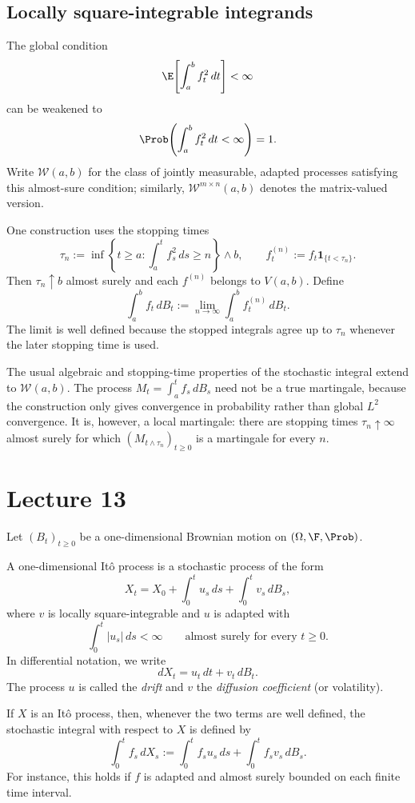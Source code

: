 \subsection*{Locally square-integrable integrands}
The global condition
\[
 \E\!\left[\int_a^b f_t^2\,dt\right]<\infty
\]
can be weakened to
\[
 \Prob\!\left(\int_a^b f_t^2\,dt<\infty\right)=1.
\]
Write $\mathcal W(a,b)$ for the class of jointly measurable, adapted
processes satisfying this almost-sure condition; similarly,
$\mathcal W^{m\times n}(a,b)$ denotes the matrix-valued version.

One construction uses the stopping times
\[
 \tau_n:=\inf\!\left\{t\ge a:\int_a^t f_s^2\,ds\ge n\right\}\wedge b,
 \qquad f^{(n)}_t:=f_t\mathbf{1}_{\{t<\tau_n\}}.
\]
Then $\tau_n\uparrow b$ almost surely and each $f^{(n)}$ belongs to
$V(a,b)$. Define
\[
 \int_a^b f_t\,dB_t
 :=\lim_{n\to\infty}\int_a^b f^{(n)}_t\,dB_t.
\]
The limit is well defined because the stopped integrals agree up to
$\tau_n$ whenever the later stopping time is used.

\begin{remark}
The usual algebraic and stopping-time properties of the stochastic integral
extend to $\mathcal W(a,b)$. The process
$M_t=\int_a^t f_s\,dB_s$ need not be a true martingale, because the
construction only gives convergence in probability rather than global
$L^2$ convergence. It is, however, a local martingale: there are stopping
times $\tau_n\uparrow\infty$ almost surely for which
$(M_{t\wedge\tau_n})_{t\ge0}$ is a martingale for every $n$.
\end{remark}
\section{Lecture 13}

Let $(B_t)_{t\ge0}$ be a one-dimensional Brownian motion on
$(\Omega,\F,\Prob)$.

\begin{definition}[It\^o process]
A one-dimensional It\^o process is a stochastic process of the form
\[
 X_t=X_0+\int_0^t u_s\,ds+\int_0^t v_s\,dB_s,
\]
where $v$ is locally square-integrable and $u$ is adapted with
\[
 \int_0^t|u_s|\,ds<\infty\qquad\text{almost surely for every }t\ge0.
\]
In differential notation, we write
\[
 dX_t=u_t\,dt+v_t\,dB_t.
\]
The process $u$ is called the \emph{drift} and $v$ the \emph{diffusion
coefficient} (or volatility).
\end{definition}

If $X$ is an It\^o process, then, whenever the two terms are well defined,
the stochastic integral with respect to $X$ is defined by
\[
 \int_0^t f_s\,dX_s
 :=\int_0^t f_su_s\,ds+\int_0^t f_sv_s\,dB_s.
\]
For instance, this holds if $f$ is adapted and almost surely bounded on each
finite time interval.

